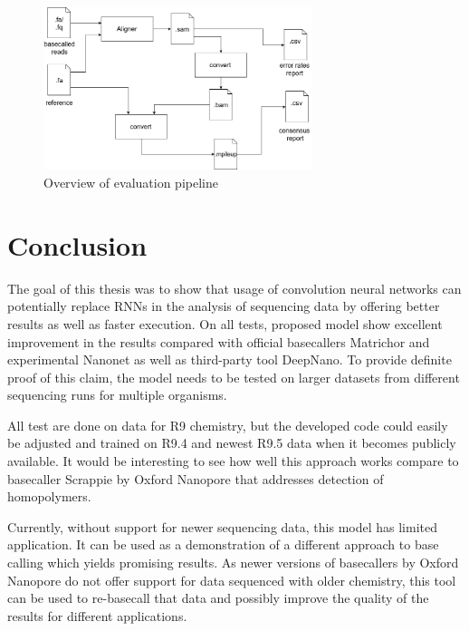 \documentclass[times, utf8, diplomski, numeric, english]{fer}
\begin{document}
\begin{figure}[!ht]
	\begin{center}
		\includegraphics[width=0.7\textwidth]{./imgs/evaluation_pipeline.png}
		\caption{Overview of evaluation pipeline}
		\label{fg:eval_pipe}
	\end{center}
\end{figure}

\chapter{Conclusion}



The goal of this thesis was to show that usage of convolution neural networks can potentially replace RNNs in the analysis of sequencing data by offering better results as well as faster execution.
On all tests, proposed model show excellent improvement in the results compared with official basecallers Matrichor and experimental Nanonet as well as third-party tool DeepNano. To provide definite proof of this claim, the model needs to be tested on larger datasets from different sequencing runs for multiple organisms.

All test are done on data for R9 chemistry, but the developed code could easily be adjusted and trained on R9.4 and newest R9.5 data when it becomes publicly available.
It would be interesting to see how well this approach works compare to basecaller Scrappie by Oxford Nanopore that addresses detection of homopolymers.

Currently, without support for newer sequencing data, this model has limited application. 
It can be used as a demonstration of a different approach to base calling which yields promising results.  As newer versions of basecallers by Oxford Nanopore do not offer support for data sequenced with older chemistry, this tool can be used to re-basecall that data and possibly improve the quality of the results for different applications.
\end{document}
